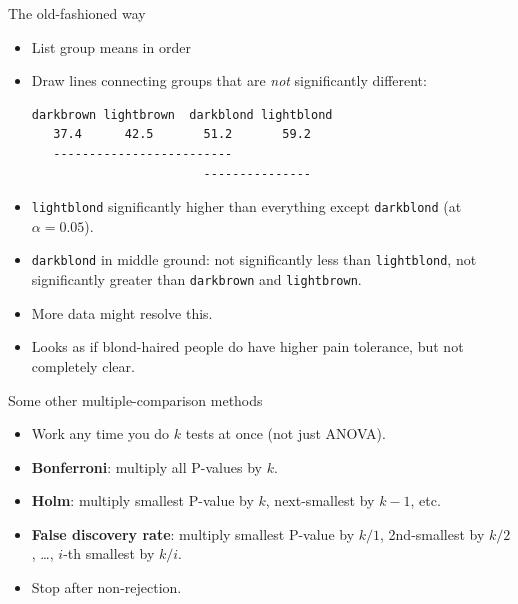 \documentclass[unknownkeysallowed]{beamer}\usepackage[]{graphicx}\usepackage[]{color}
\begin{document}
\begin{frame}[fragile]{The old-fashioned way}
  
  \begin{itemize}
  \item List group means in order
  \item Draw lines connecting groups that are \emph{not} significantly
    different:
    
\begin{verbatim}
darkbrown lightbrown  darkblond lightblond
   37.4      42.5       51.2       59.2
   -------------------------
                        ---------------
\end{verbatim}

  \item \texttt{lightblond} significantly higher than everything
    except \texttt{darkblond} (at $\alpha=0.05$).
  \item \texttt{darkblond} in middle ground: not significantly less
    than \texttt{lightblond}, not significantly greater than
    \texttt{darkbrown} and \texttt{lightbrown}.
  \item More data might resolve this.
  \item Looks as if blond-haired people do have higher pain tolerance,
    but not completely clear.
  \end{itemize}
  
\end{frame}


\begin{frame}[fragile]{Some other multiple-comparison methods}

  \begin{itemize}
    \item Work any time you do $k$ tests at once (not just ANOVA).
      
    \item \textbf{Bonferroni}: multiply all P-values by $k$.
    \item \textbf{Holm}: multiply smallest P-value by $k$, next-smallest by
      $k-1$, etc.
    \item \textbf{False discovery rate}: multiply smallest P-value by $k/1$,
      2nd-smallest by $k/2$, \ldots, $i$-th smallest by $k/i$.
      
    \item Stop after non-rejection.
  \end{itemize}
  
\end{frame}
\end{document}
